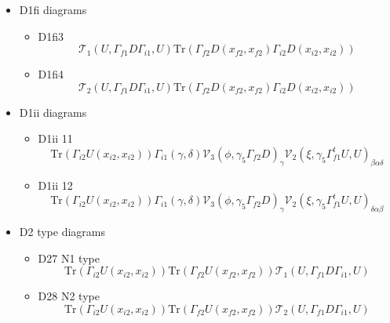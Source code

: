 \documentclass{article}[12pt]
\begin{document}
\begin{itemize}
\begin{itemize}
$$
{\mathcal T}_1\left(U,\Gamma_{f1}T^{dd}_{fii}\Gamma_{i1},U\right)\mathrm{Tr}\left(\Gamma_{f2}D\left(x_{f2},x_{f2}\right)\right)
$$
\item D1ff12
$$
{\mathcal T}_2\left(U,\Gamma_{f1}T^{dd}_{fii}\Gamma_{i1},U\right)\mathrm{Tr}\left(\Gamma_{f2}D\left(x_{f2},x_{f2}\right)\right)
$$
\end{itemize}
\item D1fi diagrams
\begin{itemize}
\item D1fi3
$$
{\mathcal T}_1\left(U,\Gamma_{f1}D\Gamma_{i1},U\right)\mathrm{Tr}\left(\Gamma_{f2}D\left(x_{f2},x_{f2}\right)\Gamma_{i2}D\left(x_{i2},x_{i2}\right)\right)
$$
\item D1fi4
$$
{\mathcal T}_2\left(U,\Gamma_{f1}D\Gamma_{i1},U\right)\mathrm{Tr}\left(\Gamma_{f2}D\left(x_{f2},x_{f2}\right)\Gamma_{i2}D\left(x_{i2},x_{i2}\right)\right)
$$
\end{itemize}
\item D1ii diagrams
\begin{itemize}
\item D1ii 11
$$
\mathrm{Tr}\left(\Gamma_{i2}U\left(x_{i2},x_{i2}\right)\right)\Gamma_{i1}\left(\gamma,\delta\right){\mathcal V}_3\left(\phi,\gamma_5\Gamma_{f2}D\right)_\gamma
{\mathcal V}_2\left(\xi,\gamma_5\Gamma_{f1}^tU,U\right)_{\beta\alpha\delta}
$$
\item D1ii 12
$$
\mathrm{Tr}\left(\Gamma_{i2}U\left(x_{i2},x_{i2}\right)\right)\Gamma_{i1}\left(\gamma,\delta\right){\mathcal V}_3\left(\phi,\gamma_5\Gamma_{f2}D\right)_\gamma
{\mathcal V}_2\left(\xi,\gamma_5\Gamma_{f1}^tU,U\right)_{\delta\alpha\beta}
$$
\end{itemize}
\item D2 type diagrams
\begin{itemize}
\item D27 N1 type
$$
\mathrm{Tr}\left(\Gamma_{i2}U\left(x_{i2},x_{i2}\right)\right)\mathrm{Tr}\left(\Gamma_{f2}U\left(x_{f2},x_{f2}\right)\right){\mathcal T}_1\left(U,\Gamma_{f1}D\Gamma_{i1},U\right)
$$
\item D28 N2 type
$$
\mathrm{Tr}\left(\Gamma_{i2}U\left(x_{i2},x_{i2}\right)\right)\mathrm{Tr}\left(\Gamma_{f2}U\left(x_{f2},x_{f2}\right)\right){\mathcal T}_2\left(U,\Gamma_{f1}D\Gamma_{i1},U\right)
$$
\end{itemize}
\end{itemize}
\end{document}
